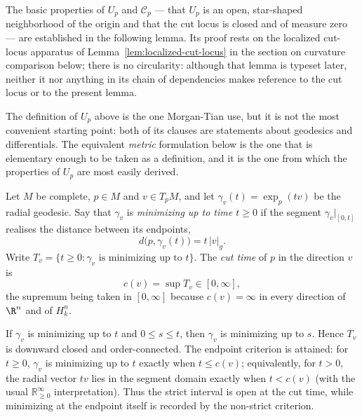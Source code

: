 The basic properties of $U_p$ and ${\mathcal C}_p$ --- that $U_p$
is an open, star-shaped neighborhood of the origin and that the
cut locus is closed and of measure zero --- are established in the
following lemma. Its proof rests on the localized cut-locus
apparatus of Lemma~\ref{lem:localized-cut-locus} in the section on
curvature comparison below; there is no circularity: although that
lemma is typeset later, neither it nor anything in its chain of
dependencies makes reference to the cut locus or to the present
lemma.

The definition of $U_p$ above is the one Morgan-Tian use, but it is not the most
convenient starting point: both of its clauses are statements about geodesics and
differentials. The equivalent \emph{metric} formulation below is the one that is
elementary enough to be taken as a definition, and it is the one from which the
properties of $U_p$ are most easily derived.

\begin{definition}
\label{def:cut-time}





Let $M$ be complete, $p\in M$ and $v\in T_pM$, and let $\gamma_v(t)=\exp_p(tv)$ be the
radial geodesic. Say that $\gamma_v$ is \emph{minimizing up to time $t\ge 0$} if the
segment $\gamma_v|_{[0,t]}$ realises the distance between its endpoints,
$$d\bigl(p,\gamma_v(t)\bigr)=t\,\lvert v\rvert_g .$$
Write $T_v=\{t\ge0 : \gamma_v \text{ is minimizing up to } t\}$. The \emph{cut time} of
$p$ in the direction $v$ is
$$c(v)=\sup T_v\in[0,\infty],$$
the supremum being taken in $[0,\infty]$ because $c(v)=\infty$ in every direction of
$\R^n$ and of $H^n_k$.
\end{definition}

\begin{lemma}
\label{lem:minimizing-downward-closed}





If $\gamma_v$ is minimizing up to $t$ and $0\le s\le t$, then $\gamma_v$ is minimizing up
to $s$. Hence $T_v$ is downward closed and order-connected. The endpoint
criterion is attained: for $t\ge0$, $\gamma_v$ is minimizing up to $t$ exactly
when $t\le c(v)$; equivalently, for $t>0$, the radial vector $t v$ lies in
the segment domain exactly when $t<c(v)$ (with the usual $\mathbb{R}_{\ge0}^{\infty}$
interpretation). Thus the strict interval is open at the cut time, while
minimizing at the endpoint itself is recorded by the non-strict criterion.
\end{lemma}

